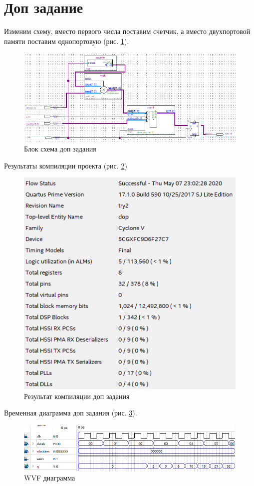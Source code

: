\documentclass[a4paper,14pt]{article}
\begin{document}
\section{Доп задание}

Изменим схему, вместо первого числа поставим счетчик, а вместо двухпортовой памяти поставим однопортовую (рис. \ref{fig:screenshot018}).

\begin{figure}[H]
	\centering
	\includegraphics[width=0.7\linewidth]{image/lab5/screenshot018}
	\caption{Блок схема доп задания}
	\label{fig:screenshot018}
\end{figure}

Результаты компиляции проекта (рис. \ref{fig:screenshot021})

\begin{figure}[H]
	\centering
	\includegraphics[width=0.7\linewidth]{image/lab5/screenshot021}
	\caption{Результат компиляции доп задания}
	\label{fig:screenshot021}
\end{figure}


Временная диаграмма доп задания (рис. \ref{fig:screenshot019}).

\begin{figure}[H]
	\centering
	\includegraphics[width=0.7\linewidth]{image/lab5/screenshot019}
	\caption{WVF диаграмма}
	\label{fig:screenshot019}
\end{figure}
\end{document}
